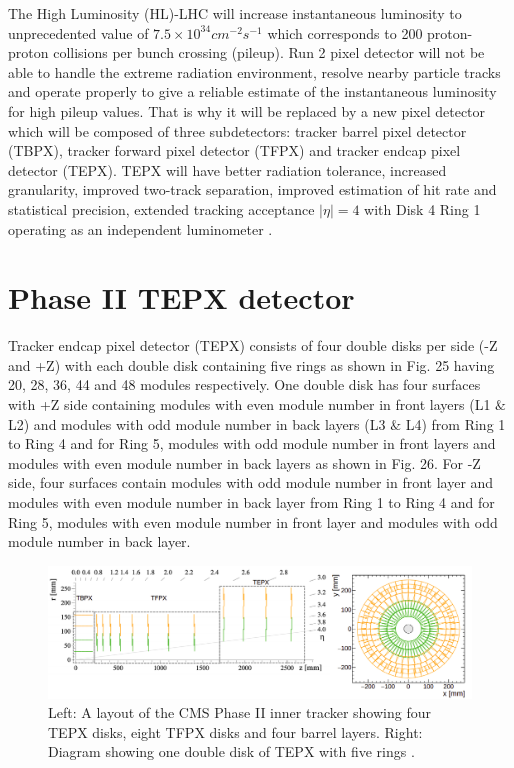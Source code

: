 The High Luminosity (HL)-LHC will increase instantaneous luminosity to unprecedented value of $7.5 \times 10^{34} cm^{-2} s^{-1}$ which corresponds to 200 proton-proton collisions per bunch crossing (pileup). Run 2 pixel detector will not be able to handle the extreme radiation environment, resolve nearby particle tracks and operate properly to give a reliable estimate of the instantaneous luminosity for high pileup values. That is why it will be replaced by a new pixel detector which will be composed of three subdetectors: tracker barrel pixel detector (TBPX), tracker forward pixel detector (TFPX) and tracker endcap pixel detector (TEPX). TEPX will have better radiation tolerance, increased granularity, improved two-track separation, improved estimation of hit rate and statistical precision, extended tracking acceptance $|\eta|=4$ with Disk 4 Ring 1 operating as an independent luminometer \cite{Klein:2017nke}. \\

\section{Phase II TEPX detector}

Tracker endcap pixel detector (TEPX) consists of four double disks per side (-Z and +Z) with each double disk containing five rings as shown in Fig. 25 having 20, 28, 36, 44 and 48 modules respectively. One double disk has four surfaces with +Z side containing modules with even module number in front layers (L1 $\&$ L2) and modules with odd module number in back layers (L3 $\&$ L4) from Ring 1 to Ring 4 and for Ring 5, modules with odd module number in front layers and modules with even module number in back layers as shown in Fig. 26. For -Z side, four surfaces contain modules with odd module number in front layer and modules with even module number in back layer from Ring 1 to Ring 4 and for Ring 5, modules with even module number in front layer and modules with odd module number in back layer. \\

\begin{figure}[H]
  \centering
  \includegraphics[width=1 \columnwidth]{ashish_thesis/tepx_tt.png}
  \caption{ \onehalfspacing Left: A layout of the CMS Phase II inner tracker showing four TEPX disks, eight TFPX disks and four barrel layers. Right: Diagram showing one double disk of TEPX with five rings \cite{Klein:2017nke}.}
  \label{fig:CMS}
\end{figure}



